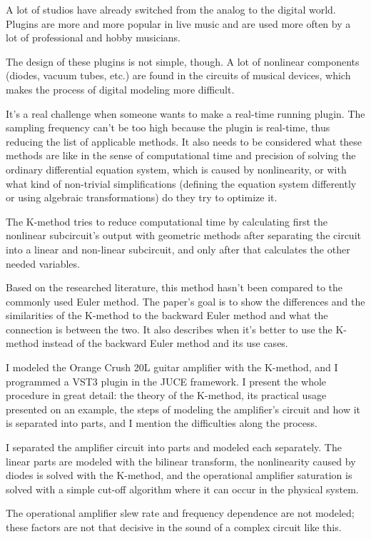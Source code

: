 A lot of studios have already switched from the analog to the digital world. Plugins are more and more popular in live music and are used 
more often by a lot of professional and hobby musicians.

The design of these plugins is not simple, though. A lot of nonlinear components (diodes, vacuum tubes, etc.) are found in the circuits of 
musical devices, which makes the process of digital modeling more difficult.

It's a real challenge when someone wants to make a real-time running plugin. The sampling frequency can't be too high because the plugin is 
real-time, thus reducing the list of applicable methods. It also needs to be considered what these methods are like in the sense of computational 
time and precision of solving the ordinary differential equation system, which is caused by nonlinearity, or with what kind of non-trivial 
simplifications (defining the equation system differently or using algebraic transformations) do they try to optimize it.

The K-method tries to reduce computational time by calculating first the nonlinear subcircuit's output with geometric methods after separating 
the circuit into a linear and non-linear subcircuit, and only after that calculates the other needed variables.

Based on the researched literature, this method hasn't been compared to the commonly used Euler method. The paper's goal is to show the differences 
and the similarities of the K-method to the backward Euler method and what the connection is between the two. It also describes when it's better to 
use the K-method instead of the backward Euler method and its use cases.

I modeled the Orange Crush 20L guitar amplifier with the K-method, and I programmed a VST3 plugin in the JUCE framework. I present the whole 
procedure in great detail: the theory of the K-method, its practical usage presented on an example, the steps of modeling the amplifier's 
circuit and how it is separated into parts, and I mention the difficulties along the process.

I separated the amplifier circuit into parts and modeled each separately. The linear parts are modeled with the bilinear transform, the 
nonlinearity caused by diodes is solved with the K-method, and the operational amplifier saturation is solved with a simple cut-off algorithm 
where it can occur in the physical system.

The operational amplifier slew rate and frequency dependence are not modeled; these factors are not that decisive in the sound of a complex 
circuit like this. 
\vfill
\cleardoublepage

\selectthesislanguage

\setcounter{romanPage}{\value{page}}
